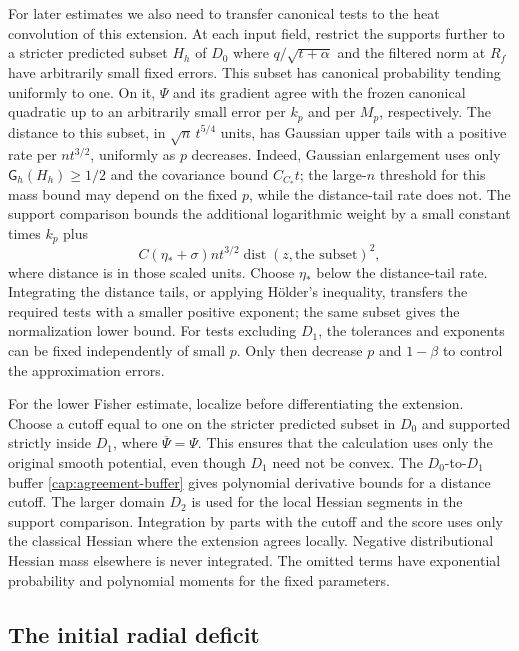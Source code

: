 For later estimates we also need to transfer canonical tests to the heat
convolution of this extension. At each input field, restrict the supports
further to a stricter predicted subset $H_h$ of $D_0$ where $q/\sqrt{t+\alpha}$
and the filtered norm at $R_f$ have arbitrarily small fixed errors. This subset has canonical probability
tending uniformly to one. On it, $\Psi$ and its gradient agree with the frozen
canonical quadratic up to an arbitrarily small error per $k_p$ and per $M_p$,
respectively. The distance to this subset, in $\sqrt n\,t^{5/4}$ units, has
Gaussian upper tails with a positive rate per $nt^{3/2}$, uniformly as $p$
decreases. Indeed, Gaussian enlargement uses only
$\mathsf G_h(H_h)\ge1/2$ and the covariance bound $C_{C_*}t$;
the large-$n$ threshold for this mass bound may depend on the fixed $p$,
while the distance-tail rate does not. The support comparison bounds the additional logarithmic weight by
a small constant times $k_p$ plus
\[
 C(\eta_*+\sigma)nt^{3/2}
      \operatorname{dist}(z,\text{the subset})^2,
\]
where distance is in those scaled units. Choose $\eta_*$ below the
distance-tail rate. Integrating the distance tails, or applying H\"older's
inequality, transfers the required tests with a smaller positive exponent; the
same subset gives the normalization lower bound. For tests excluding $D_1$,
the tolerances and exponents can be fixed
independently of small $p$. Only then decrease $p$ and $1-\beta$ to control
the approximation errors.

For the lower Fisher estimate, localize before differentiating the extension.
Choose a cutoff equal to one on the stricter predicted subset in $D_0$ and
supported strictly inside $D_1$, where $\overline\Psi=\Psi$. This ensures
that the calculation uses only the original smooth potential, even though
$D_1$ need not be convex. The $D_0$-to-$D_1$ buffer
\eqref{cap:agreement-buffer} gives polynomial derivative bounds for a
distance cutoff. The larger domain $D_2$ is used for the local Hessian
segments in the support comparison. Integration by parts with the cutoff and the
score uses only the classical Hessian where the extension agrees locally.
Negative distributional Hessian mass elsewhere is never integrated. The
omitted terms have exponential probability and polynomial moments for the
fixed parameters.

\subsection{The initial radial deficit}

